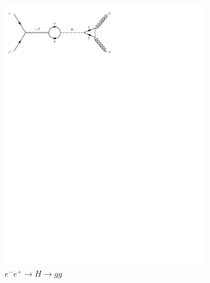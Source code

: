 \begin{figure}[h]
\begin{subfigure}[b]{0.3\textwidth}
    \includegraphics[trim={0.5cm 22cm 10cm 0cm},width=\textwidth]{../Diagrams/D12.pdf}
    \caption{$e^-e^+\rightarrow H \rightarrow gg$}
    \label{fey:12}
  \end{subfigure}
  \newline
  \newline
  \begin{subfigure}[b]{0.3\textwidth}

\end{subfigure}
\end{figure}
